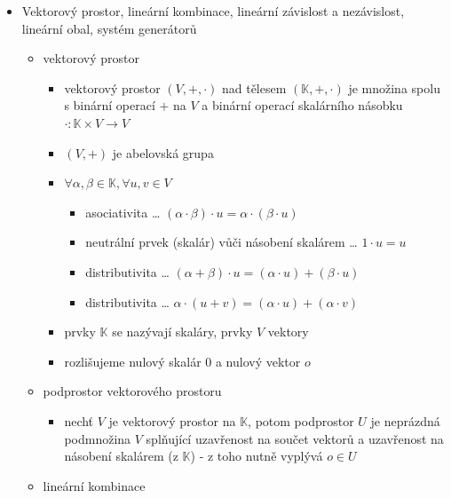 \begin{itemize}
\begin{itemize}
\begin{enumerate}
\end{enumerate}
\item inverzní matici k matici $A$ lze najít pomocí Gaussovy-Jordanovy eliminace $(A|I_n)\sim\sim(I_n|A^{-1})$
\begin{itemize}
\item pokud tento proces selže, tak je $A$ singulární
\end{itemize}
\end{itemize}
\item Vektorový prostor, lineární kombinace, lineární závislost a nezávislost, lineární obal, systém generátorů
\begin{itemize}
\item vektorový prostor
\begin{itemize}
\item vektorový prostor $(V,+,\cdot)$ nad tělesem $(\mathbb K, +,\cdot)$ je množina spolu s binární operací $+$ na $V$ a binární operací skalárního násobku $\cdot: \mathbb K \times V \rightarrow V$
\item $(V,+)$ je abelovská grupa
\item $\forall \alpha,\beta \in \mathbb K, \forall u,v \in V$
\begin{itemize}
\item asociativita \dots{} $(\alpha \cdot \beta) \cdot u = \alpha \cdot (\beta \cdot u)$
\item neutrální prvek (skalár) vůči násobení skalárem \dots{} $1 \cdot u = u$
\item distributivita \dots{} $(\alpha + \beta) \cdot u = (\alpha \cdot u) + (\beta \cdot u)$
\item distributivita \dots{} $\alpha \cdot (u+v)=(\alpha \cdot u)+(\alpha \cdot v)$
\end{itemize}
\item prvky $\mathbb K$ se nazývají skaláry, prvky $V$ vektory
\item rozlišujeme nulový skalár $0$ a nulový vektor $o$
\end{itemize}
\item podprostor vektorového prostoru
\begin{itemize}
\item nechť $V$ je vektorový prostor na $\mathbb K$, potom podprostor $U$ je neprázdná podmnožina $V$ splňující uzavřenost na součet vektorů a uzavřenost na násobení skalárem (z $\mathbb K$) - z toho nutně vyplývá $o \in U$
\end{itemize}
\item lineární kombinace
\begin{itemize}

\end{itemize}
\end{itemize}
\end{itemize}
